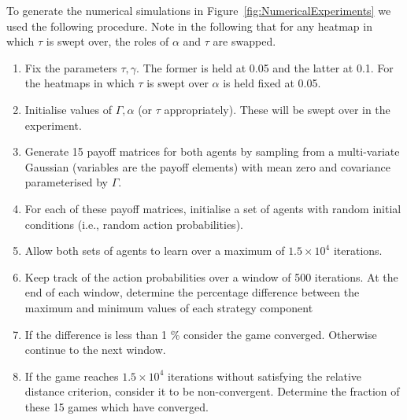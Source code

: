 \documentclass[sigconf,anonymous]{aamas}
\newcommand\fb[1]{\textcolor{blue}{FB: #1}}
\begin{document}
To generate the numerical simulations in Figure~\ref{fig:NumericalExperiments} we used the
following procedure. Note in the following that for any heatmap in which $\tau$ is swept over, the roles of $\alpha$ and $\tau$ are swapped.
\begin{enumerate}
   \item Fix the parameters $\tau, \gamma$. The former is held at 0.05 and the latter at 0.1. For the heatmaps in which $\tau$ is swept over $\alpha$ is held fixed at 0.05.
   \item Initialise values of $\Gamma, \alpha$ (or $\tau$ appropriately). These will be swept over in the experiment.
\item Generate 15 payoff matrices for both agents by sampling from a multi-variate Gaussian 
(variables are the payoff elements) with mean zero and covariance parameterised by $\Gamma$.
\item For each of these payoff matrices, initialise a set of agents with random initial conditions (i.e., random action probabilities).
\item Allow both sets of agents to learn over a maximum of $1.5 \times 10^4$ iterations.
\item Keep track of the action probabilities over a window of 500 iterations. At the end of each window, determine the percentage difference between the maximum and minimum values of each strategy component
\item If the difference is less than 1 \% consider the game converged. Otherwise continue to the next window.
\item If the game reaches $1.5 \times 10^4$ iterations without satisfying the relative distance criterion, consider it to be non-convergent. Determine the fraction of these 15 games which have converged.


\end{enumerate}
   
\end{document}
